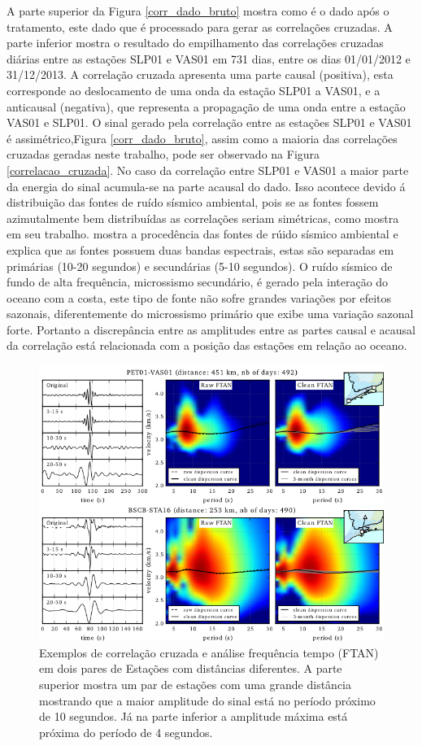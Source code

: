 A parte superior da Figura \ref{corr_dado_bruto} mostra como é o dado após o tratamento, este dado que é processado para gerar as correlações cruzadas. A parte inferior mostra o resultado do empilhamento das correlações cruzadas diárias entre as estações SLP01 e VAS01 em 731 dias, entre os dias 01/01/2012 e 31/12/2013.  A correlação cruzada apresenta uma parte causal (positiva), esta corresponde ao deslocamento de uma onda da estação SLP01 a VAS01, e a anticausal (negativa), que representa a propagação de uma onda entre a estação VAS01 e SLP01. O sinal gerado pela correlação entre as estações SLP01 e VAS01 é assimétrico,Figura \ref{corr_dado_bruto}, assim como a maioria das correlações cruzadas geradas neste trabalho, pode ser observado na Figura \ref{correlacao_cruzada}. No caso da correlação entre SLP01 e VAS01 a maior parte da energia do sinal acumula-se na parte acausal do dado. Isso acontece devido á distribuição das fontes de ruído sísmico ambiental, pois se as fontes fossem azimutalmente bem distribuídas as correlações seriam simétricas, como mostra \cite{stehly_study_2006} em seu trabalho. \cite{stehly_study_2006} mostra a procedência das fontes de rúido sísmico ambiental e explica que as fontes possuem duas bandas espectrais, estas são separadas em primárias (10-20 segundos) e secundárias (5-10 segundos). O ruído sísmico de fundo  de alta frequência, microssismo secundário, é gerado pela interação do oceano com a costa, este tipo de fonte não sofre grandes variações por efeitos sazonais, diferentemente do microssismo primário que exibe uma variação sazonal forte. Portanto a discrepância entre as amplitudes entre as partes causal e acausal da correlação está relacionada com a posição das estações em relação ao oceano. 

\begin{figure}[!ht]
\centering
\includegraphics[scale=0.8]{Figs/fonte_FTAN.png}
\caption{Exemplos de correlação cruzada e análise frequência tempo (FTAN) em dois pares de Estações com distâncias diferentes. A parte superior mostra um par de estações com uma grande distância mostrando que a maior amplitude do sinal está no período próximo de 10 segundos. Já na parte inferior a amplitude máxima está próxima do período de 4 segundos.}
\label{fonte_FTAN}
\end{figure}


